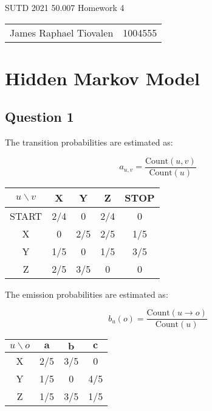 \documentclass[11pt,fancychapters]{article}
\begin{document}
\centerline{\huge{SUTD 2021 50.007 Homework 4}}

\begin{table}[ht]
\centering
\footnotesize
 \begin{tabular}{c c} 
James Raphael Tiovalen & 1004555
 \end{tabular}
\end{table}

\section*{Hidden Markov Model}

\subsection*{Question 1}

The transition probabilities are estimated as:

\begin{equation*}
	a_{u,v} = \frac{\text{Count}(u, v)}{\text{Count}(u)}
\end{equation*}

\begin{table}[h!]
	\centering
	\begin{tabular}{| c | c | c | c | c |}
		\hline
		$u \backslash v$ & X & Y & Z & STOP \\
		\hline
		START & 2/4 & 0 & 2/4 & 0 \\
		\hline
		X & 0 & 2/5 & 2/5 & 1/5 \\
		\hline
		Y & 1/5 & 0 & 1/5 & 3/5 \\
		\hline
		Z & 2/5 & 3/5 & 0 & 0 \\ [1ex] 
		\hline
	\end{tabular}
\end{table}

The emission probabilities are estimated as:

\begin{equation*}
	b_{u}(o) = \frac{\text{Count}(u \rightarrow o)}{\text{Count}(u)}
\end{equation*}

\begin{table}[h!]
	\centering
	\begin{tabular}{| c | c | c | c |}
		\hline
		$u \backslash o$ & $\textbf{a}$ & $\textbf{b}$ & $\textbf{c}$ \\
		\hline
		X & 2/5 & 3/5 & 0 \\
		\hline
		Y & 1/5 & 0 & 4/5 \\
		\hline
		Z & 1/5 & 3/5 & 1/5 \\ [1ex] 
		\hline
	\end{tabular}
\end{table}
\end{document}
